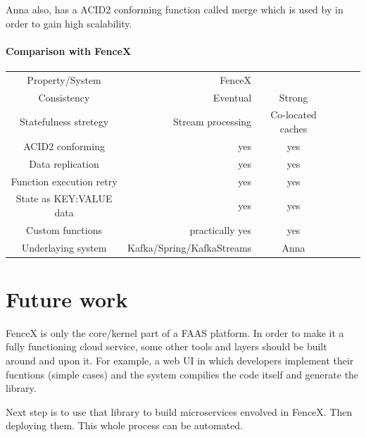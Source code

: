 \documentclass[a4]{report}
\begin{document}
        Anna also, has a ACID2 conforming function called merge which is used by \cite{Functions-as-a-Service-2020} in
        order to gain high scalability.

        \paragraph{Comparison with FenceX}
        \begin{center}
            \begin{tabular}{ cr cr cr }
                Property/System  & FenceX  &    \cite{Functions-as-a-Service-2020} \\
                Consistency  & Eventual  &  Strong  \\
                Statefulness stretegy  & Stream processing  &  Co-located caches  \\
                ACID2 conforming  & yes  &  yes  \\
                Data replication  & yes  &  yes  \\
                Function execution retry  & yes  &  yes  \\
                State as KEY:VALUE data  & yes  &  yes  \\
                Custom functions  & practically yes  &  yes  \\
                Underlaying system  & Kafka/Spring/KafkaStreams  &  Anna  \\
            \end{tabular}
        \end{center}

        \section{Future work}
        FenceX is only the core/kernel part of a FAAS platform.
        In order to make it a fully functioning cloud service, some other tools and layers should be built around and
        upon it.
        For example, a web UI in which developers implement their fucntions (simple cases) and the system compilies
        the code itself and generate the library.

        Next step is to use that library to build microservices envolved in FenceX.
        Then deploying them.
        This whole process can be automated.

        \nocite{*}
        
        
    
\end{document}
